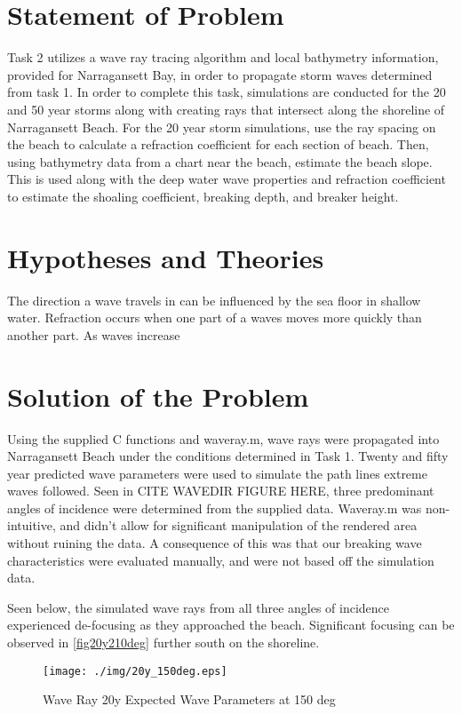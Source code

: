 \section{Statement of Problem}
Task 2 utilizes a wave ray tracing algorithm and local bathymetry information, provided for Narragansett Bay, in order to propagate storm waves determined from task 1. In order to complete this task, simulations are conducted for the 20 and 50 year storms along with creating rays that intersect along the shoreline of Narragansett Beach. For the 20 year storm simulations, use the ray spacing on the beach to calculate a refraction coefficient for each section of beach. Then, using bathymetry data from a chart near the beach, estimate the beach slope. This is used along with the deep water wave properties and refraction coefficient to estimate the shoaling coefficient, breaking depth, and breaker height. 
\section{Hypotheses and Theories}

The direction a wave travels in can be influenced by the sea floor in shallow water. Refraction occurs when one part of a waves moves more quickly than another part. As waves increase 

\section{Solution of the Problem}

Using the supplied C functions and waveray.m, wave rays were propagated into Narragansett Beach under the conditions determined in Task 1. Twenty and fifty year predicted wave parameters were used to simulate the path lines extreme waves followed. Seen in CITE WAVEDIR FIGURE HERE, three predominant angles of incidence were determined from the supplied data. Waveray.m  was non-intuitive, and didn't allow for significant manipulation of the rendered area without ruining the data. A consequence of this was that our breaking wave characteristics were evaluated manually, and were not based off the simulation data.

Seen below, the simulated wave rays from all three angles of incidence experienced de-focusing as they approached the beach. Significant focusing can be observed in \ref{fig20y210deg} further south on the shoreline. 

\begin{figure}[H]
\centering
\texttt{[image: ./img/20y\_150deg.eps]}
\caption{Wave Ray 20y Expected Wave Parameters at 150 deg}
\label{fig:20y150deg}
\end{figure}

